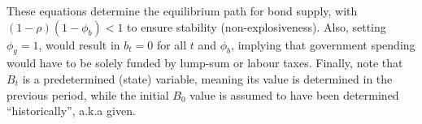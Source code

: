 These equations determine the equilibrium path for bond supply, with \linebreak $(1-\rho)(1-\phi_b) < 1$ to ensure stability (non-explosiveness). Also, setting $\phi_g = 1$, would result in $b_t = 0$ for all $t$ and $\phi_b$, implying that government spending would have to be solely funded by lump-sum or labour taxes. Finally, note that $B_t$ is a predetermined (state) variable, meaning its value is determined in the previous period, while the initial $B_0$ value is assumed to have been determined ``historically'', a.k.a given.